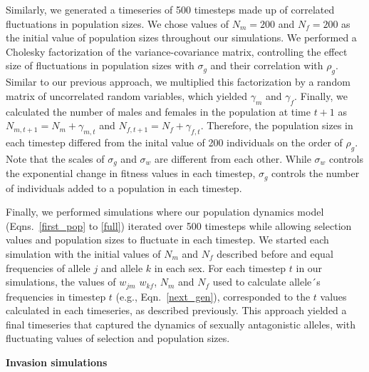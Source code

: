 \documentclass[12pt]{article}
\begin{document}
Similarly, we generated a timeseries of 500 timesteps made up of correlated fluctuations in population sizes. We chose values of $N_{m}= 200$ and $N_{f}=200$ as the initial value of population sizes throughout our simulations. We performed a Cholesky factorization of the variance-covariance matrix, controlling the effect size of fluctuations in population sizes with $\sigma_{g}$ and their correlation with $\rho_{g}$. Similar to our previous approach, we multiplied this factorization by a random matrix of uncorrelated random variables, which yielded $\gamma_{m}$ and $\gamma_{f}$. Finally, we calculated the number of males and females in the population at time $t+1$ as $N_{m,t+1} = N_{m} + \gamma_{m,t}$ and $N_{f,t+1} = N_{f}+ \gamma_{f,t} $. Therefore, the population sizes in each timestep differed from the inital value of 200 individuals on the order of $\rho_{g}$. Note that the scales of $\sigma_{g}$ and  $\sigma_{w}$ are different from each other. While $\sigma_{w}$ controls the exponential change in fitness values in each timestep, $\sigma_{g}$ controls the number of individuals added to a population in each timestep.



Finally, we performed simulations where our population dynamics model (Eqns.~\ref{first_pop} to \ref{full}) iterated over 500 timesteps while allowing selection values and population sizes to fluctuate in each timestep. We started each simulation with the initial values of $N_{m}$ and $N_{f}$ described before and equal frequencies of allele $j$ and allele $k$ in each sex. For each timestep $t$ in our simulations, the values of $w_{jm}$ $w_{kf}$, $N_{m}$ and $N_{f}$ used to calculate allele´s frequencies in timestep $t$ (e.g., Eqn.~\ref{next_gen}), corresponded to the $t$ values calculated in each timeseries, as described previously. This approach yielded a final timeseries that captured the dynamics of sexually antagonistic alleles, with fluctuating values of selection and population sizes.

\vspace{5mm}
\noindent\textbf{Invasion simulations}
\end{document}
